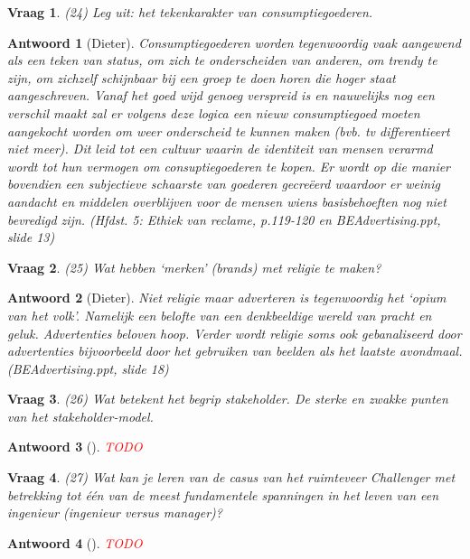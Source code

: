 \documentclass{article}
\theoremstyle{nonumberplain}
\newtheorem{question}{Vraag}
\newtheorem{answer}{Antwoord}
\begin{document}
\begin{question}
(24)	Leg uit: het tekenkarakter van consumptiegoederen. 
\end{question}
\begin{answer}[Dieter]
	Consumptiegoederen worden tegenwoordig vaak aangewend als een teken van status, om zich te onderscheiden van anderen, om trendy te zijn, om zichzelf schijnbaar bij een groep te doen horen die hoger staat aangeschreven.
	Vanaf het goed wijd genoeg verspreid is en nauwelijks nog een verschil maakt zal er volgens deze logica een nieuw consumptiegoed moeten aangekocht worden om weer onderscheid te kunnen maken (bvb. tv differentieert niet meer).
	Dit leid tot een cultuur waarin de identiteit van mensen verarmd wordt tot hun vermogen om consuptiegoederen te kopen.
	Er wordt op die manier bovendien een subjectieve schaarste van goederen gecre\"eerd waardoor er weinig aandacht en middelen overblijven voor de mensen wiens basisbehoeften nog niet bevredigd zijn. 
	\textit{(Hfdst. 5: Ethiek van reclame, p.119-120 en BEAdvertising.ppt, slide 13)}
\end{answer}

\begin{question}
(25)	Wat hebben `merken' (brands) met religie te maken? 
\end{question}
\begin{answer}[Dieter]
	Niet religie maar adverteren is tegenwoordig het `opium van het volk'. Namelijk een belofte van een denkbeeldige wereld van pracht en geluk. Advertenties beloven hoop. Verder wordt religie soms ook gebanaliseerd door advertenties bijvoorbeeld door het gebruiken van beelden als het laatste avondmaal. \textit{(BEAdvertising.ppt, slide 18)}
\end{answer}

\begin{question}
(26)	Wat betekent het begrip stakeholder. De sterke en zwakke punten van het stakeholder-model.
\end{question}
\begin{answer}[]
\textcolor{red}{TODO}%
\end{answer}

\begin{question}
(27)	Wat kan je leren van de casus van het ruimteveer Challenger met betrekking tot \'e\'en van de meest fundamentele spanningen in het leven van een ingenieur (ingenieur versus manager)? 
\end{question}
\begin{answer}[]
\textcolor{red}{TODO}%
\end{answer}
\end{document}
